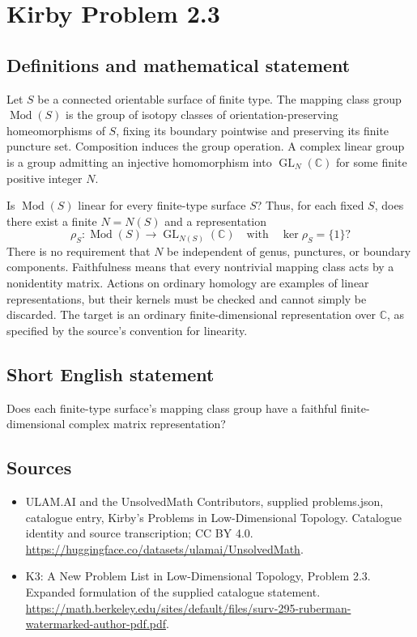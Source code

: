 \documentclass[11pt,a4paper]{article}
\begin{document}
\section*{Kirby Problem 2.3}\label{statement}

\subsection{Definitions and mathematical statement}
Let $S$ be a connected orientable surface of finite type. The mapping class
group $\operatorname{Mod}(S)$ is the group of isotopy classes of
orientation-preserving homeomorphisms of $S$, fixing its boundary pointwise and
preserving its finite puncture set. Composition induces the group operation.
A complex linear group is a group admitting an injective homomorphism into
$\operatorname{GL}_N(\mathbb C)$ for some finite positive integer $N$.

Is $\operatorname{Mod}(S)$ linear for every finite-type surface $S$? Thus, for
each fixed $S$, does there exist a finite $N=N(S)$ and a representation
\[
\rho_S:\operatorname{Mod}(S)\longrightarrow\operatorname{GL}_{N(S)}(\mathbb C)
\quad\text{with}\quad\ker\rho_S=\{1\}?
\]
There is no requirement that $N$ be independent of genus, punctures, or boundary
components. Faithfulness means that every nontrivial mapping class acts by a
nonidentity matrix. Actions on ordinary homology are examples of linear
representations, but their kernels must be checked and cannot simply be
discarded. The target is an ordinary finite-dimensional representation over
$\mathbb C$, as specified by the source's convention for linearity.
\subsection{Short English statement}
Does each finite-type surface's mapping class group have a faithful finite-dimensional complex matrix representation?
\subsection{Sources}
\begin{itemize}
\item[S1] ULAM.AI and the UnsolvedMath Contributors, supplied problems.json, catalogue entry, Kirby's Problems in Low-Dimensional Topology. Catalogue identity and source transcription; CC BY 4.0.
\url{https://huggingface.co/datasets/ulamai/UnsolvedMath}.
\item[S2] K3: A New Problem List in Low-Dimensional Topology, Problem 2.3. Expanded formulation of the supplied catalogue statement.
\url{https://math.berkeley.edu/sites/default/files/surv-295-ruberman-watermarked-author-pdf.pdf}.
\end{itemize}
\end{document}
